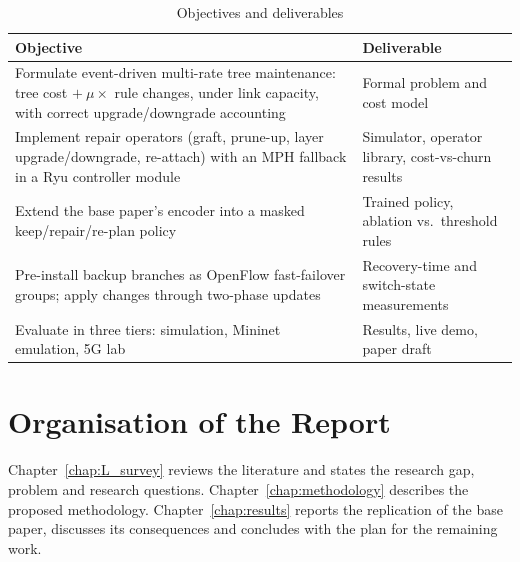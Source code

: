 \begin{table}[!htb]
\caption{Objectives and deliverables}
\label{tab:objectives}
\begin{center}
\small
\renewcommand{\arraystretch}{1.15}
\begin{tabular}{|L{9.0cm}|L{5.0cm}|}
\hline
\textbf{Objective} & \textbf{Deliverable} \\
\hline\hline
Formulate event-driven multi-rate tree maintenance: tree cost $+\ \mu\times$ rule changes, under link capacity, with correct upgrade/downgrade accounting & Formal problem and cost model \\ \hline
Implement repair operators (graft, prune-up, layer upgrade/downgrade, re-attach) with an MPH fallback in a Ryu controller module & Simulator, operator library, cost-vs-churn results \\ \hline
Extend the base paper's encoder into a masked keep/repair/re-plan policy & Trained policy, ablation vs.\ threshold rules \\ \hline
Pre-install backup branches as OpenFlow fast-failover groups; apply changes through two-phase updates & Recovery-time and switch-state measurements \\ \hline
Evaluate in three tiers: simulation, Mininet emulation, 5G lab & Results, live demo, paper draft \\
\hline
\end{tabular}
\end{center}
\end{table}

\section{Organisation of the Report}\label{sec:intro_org}
\noindent Chapter~\ref{chap:L_survey} reviews the literature and states the research gap, problem and research questions. Chapter~\ref{chap:methodology} describes the proposed methodology. Chapter~\ref{chap:results} reports the replication of the base paper, discusses its consequences and concludes with the plan for the remaining work.
